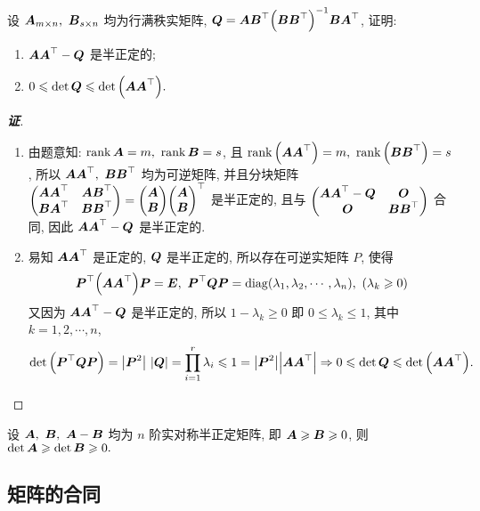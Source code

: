 \begin{example}[1994 华中师范大学]
    设 $\vb*{A}_{m\times n},~\vb*{B}_{s\times n}$ 均为行满秩实矩阵, $\vb*{Q}=\vb*{AB}^\top\qty(\vb*{BB}^\top)^{-1}\vb*{BA}^\top$, 证明:
    \begin{enumerate}[label=(\arabic{*})]
        \item $\vb*{AA}^\top-\vb*{Q}$ 是半正定的;
        \item $0\leqslant \det\vb*{Q}\leqslant \det\qty(\vb*{AA}^\top).$
    \end{enumerate}
\end{example}
\begin{proof}[{\songti \textbf{证}}]
    \begin{enumerate}[label=(\arabic{*})]
        \item 由题意知: $\rank\vb*{A}=m,~\rank\vb*{B}=s$, 且 $\rank\qty(\vb*{AA}^\top)=m,~\rank\qty(\vb*{BB}^\top)=s$, 
              所以 $\vb*{AA}^\top,~\vb*{BB}^\top$ 均为可逆矩阵, 并且分块矩阵 $\mqty(\vb*{AA}^\top&\vb*{AB}^\top\\\vb*{BA}^\top&\vb*{BB}^\top)=\mqty(\vb*{A}\\\vb*{B})\mqty(\vb*{A}\\\vb*{B})^\top$ 是半正定的, 且与 $\mqty(\vb*{AA}^\top-\vb*{Q}&\vb*{O}\\\vb*{O}&\vb*{BB}^\top)$ 合同, 
              因此 $\vb*{AA}^\top-\vb*{Q}$ 是半正定的.
        \item 易知 $\vb*{AA}^\top$ 是正定的, $\vb*{Q}$ 是半正定的, 所以存在可逆实矩阵 $P$, 使得 $$\vb*{P}^\top\qty(\vb*{AA}^\top)\vb*{P}=\vb*{E},~\vb*{P}^\top\vb*{QP}=\mathrm{diag}(\lambda_1,\lambda_2,\cdots,\lambda_n),~(\lambda_k\geqslant 0)$$
              又因为 $\vb*{AA}^\top-\vb*{Q}$ 是半正定的, 所以 $1-\lambda_k\geqslant 0$ 即 $0\leqslant \lambda_k\leqslant 1$, 其中 $k=1,2,\cdots,n$, 
              $$\det\qty(\vb*{P}^\top\vb*{QP})=\qty|\vb*{P}^2|~\qty|\vb*{Q}|=\prod_{i=1}^{r}\lambda_i\leqslant 1=\qty|\vb*{P}^2|\qty|\vb*{AA}^\top|\Rightarrow 0\leqslant \det\vb*{Q}\leqslant \det\qty(\vb*{AA}^\top).$$
    \end{enumerate}
\end{proof}

\begin{inference}[实对称半正定矩阵的单调性]
    设 $\vb*{A},~\vb*{B},~\vb*{A}-\vb*{B}$ 均为 $n$ 阶实对称半正定矩阵, 即 $\vb*{A}\geqslant \vb*{B}\geqslant 0$, 则 $\det\vb*{A}\geqslant \det\vb*{B}\geqslant 0.$
\end{inference}

\subsection{矩阵的合同}

